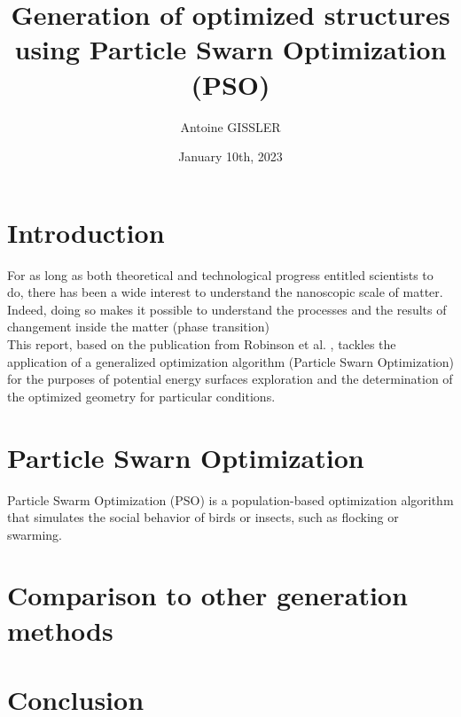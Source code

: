 \documentclass[11pt]{article}
\title{\textbf{Generation of optimized structures using Particle Swarn Optimization (PSO)}}
\author{Antoine GISSLER}
\date{January 10th, 2023}
\begin{document}
\maketitle

\section{Introduction}
For as long as both theoretical and technological progress entitled scientists to do, there has been a wide interest to understand the nanoscopic scale of matter. Indeed, doing so makes it possible to understand the processes and the results of changement inside the matter (phase transition) \\

This report, based on the publication from Robinson et al. \cite{original}, tackles the application of a generalized optimization algorithm (Particle Swarn Optimization) for the purposes of potential energy surfaces exploration and the determination of the optimized geometry for particular conditions.

\section{Particle Swarn Optimization}
Particle Swarm Optimization (PSO) is a population-based optimization algorithm that simulates the social behavior of birds or insects, such as flocking or swarming.
\section{Comparison to other generation methods}

\section{Conclusion}



\end{document}
